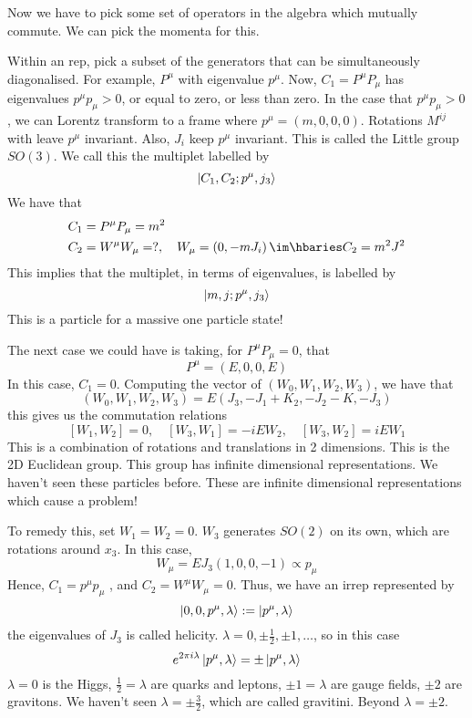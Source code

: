 \documentclass[11pt, oneside]{article}   	%
\theoremstyle{slanted}
\begin{document}
Now we have to pick some set of 
operators in the algebra which mutually commute. 
We can pick the momenta for this. 

Within an rep, pick a subset of the generators that can be simultaneously diagonalised. 
For example, $ P ^ \mu  $ with eigenvalue $ p ^ \mu $. 
Now, $ C _ 1  = P ^ \mu P _ \mu  $ has eigenvalues $ p ^ \mu p _ \mu > 0 $, or equal to zero, 
or less than zero. 
In the case that  $ p ^ \mu p _ \mu > 0 $, we 
can Lorentz transform to a frame where $ p ^ \mu  = \left( m , 0 , 0  , 0  \right)  $. 
Rotations $ M ^{ ij } $ 
with leave $ p ^ \mu $ invariant.
Also, $ J _ i $ keep $ p ^ \mu$ invariant.
This is called the Little group $ SO ( 3 ) $. 
We call this the multiplet labelled by 
\[
 \ket{ C _1 , C _ 2 ; p ^ \mu , j _ 3 } 
\] We have that 
\begin{align*}
	C_1  &=  P ^ \mu P _ \mu  = m ^ 2  \\ 
	C_2 &=  W ^ \mu W _ \mu  = ? , \quad W _ \mu  = \left( 0 , 
	 - m J _  i \right) \im\hbaries C _ 2  = m ^ 2 J ^ 2   \\
\end{align*}
This implies that the multiplet, in terms of eigenvalues, 
is labelled by 
\[
 \ket{ m , j ; p ^ \mu , j _ 3 } 
\] This is a particle for a 
massive one particle state! 


The next case we could have 
is taking, for $ P ^ \mu P _ \mu  =0   $, 
that 
\[
 P ^ \mu  = \left( E , 0 , 0 , E  \right)
\] In this case, $ C _  1 =0 $. 
Computing the vector of $ \left( W_ 0 , W _1 , W _ 2, W_  3  \right)  $, 
we have that 
\[
	\left( W_0, W_1 , W_2, W_3  \right)   = E \left( 
	J _ 3,  - J _1 + K _ 2 ,  - J _ 2  - K ,  -J _ 3 \right) 
\] this gives us the commutation 
relations 
\[
 \left[  W_1 , W _ 2   \right]  =0 , \quad \left[  W _ 3,  W_ 1  \right]  
  =  - i E W _2 , \quad \left[  W _ 3, W _ 2  \right]   = i E W_ 1 
\] This is a combination 
of rotations and translations in 2 dimensions. 
This is the 2D Euclidean group. 
This group has
infinite dimensional representations. 
We haven't seen these particles 
before. These are infinite dimensional representations 
which cause a problem! 

To remedy this, set $ W_ 1  = W_ 2 = 0 $. 
$ W _ 3   $ generates $ SO ( 2 ) $ on its 
own, which are rotations around $ x _ 3 $. 
In this case, 
\[
 W_ \mu  = E J _ 3 \left( 1, 0 , 0 , - 1   \right)  \propto p _ \mu 
\] Hence, $ C _ 1 = p ^ \mu p _ \mu $ , 
and $ C _ 2  =  W^ \mu W _ \mu  = 0 $. 
Thus, we have an irrep represented by 
\[
 \ket{ 0 , 0 , p ^ \mu , \lambda } : = \ket{ p ^ \mu , \lambda } 
\] the eigenvalues of $ J _  3 $ is called helicity. 
$ \lambda  = 0 , \pm \frac{1}{2 } , \pm 1 , \dots $, 
so in this case 
\[
 e ^{  2 \pi i \lambda  } \ket{ p ^ \mu , \lambda }  = \pm \ket{ p^ \mu , \lambda } 
\] $ \lambda  = 0 $ is the Higgs, 
$ \frac{1}{2 }  = \lambda $ are quarks and leptons, 
$ \pm 1  = \lambda $ are gauge fields, 
$ \pm  2  $ are gravitons. 
We haven't seen $ \lambda  = \pm \frac{3}{2 } $, 
which are called gravitini. 
Beyond $ \lambda  = \pm 2 $. 
\end{document}
